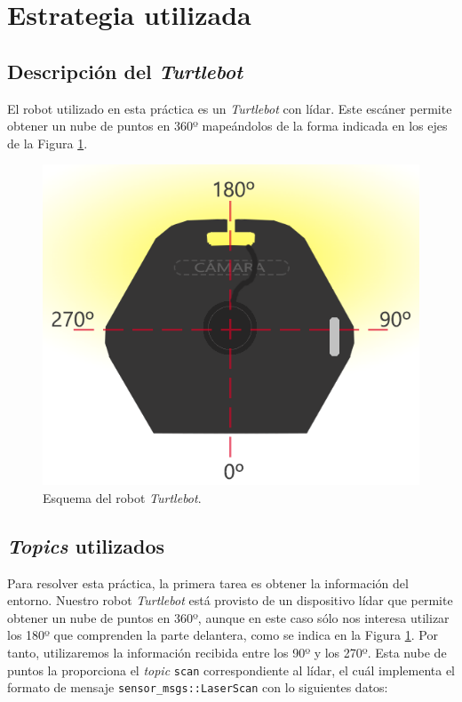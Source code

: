 \section{Estrategia utilizada}

\subsection{Descripción del \emph{Turtlebot}}

El robot utilizado en esta práctica es un \textit{Turtlebot} con lídar. Este escáner permite obtener un nube de puntos en 360º mapeándolos de la forma indicada en los ejes de la Figura \ref{fig:robot}.

\begin{figure}[!ht]
    \centering
    \includegraphics[scale=0.35]{images/robot.png}
    \caption{Esquema del robot \textit{Turtlebot}.}
    \label{fig:robot}
\end{figure}


\subsection{\emph{Topics} utilizados}
Para resolver esta práctica, la primera tarea es obtener la información del entorno. Nuestro robot \textit{Turtlebot} está provisto de un dispositivo lídar que permite obtener un nube de puntos en 360º, aunque en este caso sólo nos interesa utilizar los 180º que comprenden la parte delantera, como se indica en la Figura \ref{fig:robot}. Por tanto, utilizaremos la información recibida entre los 90º y los 270º. Esta nube de puntos la proporciona el \emph{topic} \texttt{scan} correspondiente al lídar, el cuál implementa el formato de mensaje \texttt{sensor\_msgs::LaserScan} con lo siguientes datos:



